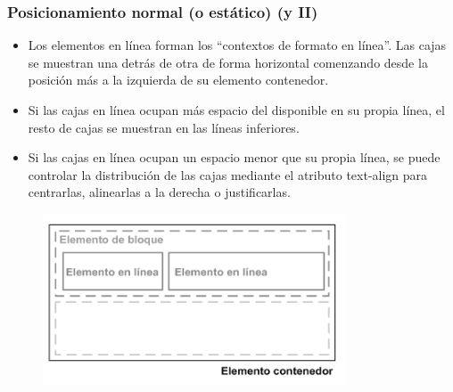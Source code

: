\documentclass[ucs]{beamer}
\begin{document}
\begin{frame}
\frametitle{Posicionamiento normal (o estático) (y II)}

\begin{itemize}
  \item Los elementos en línea forman los ``contextos de formato en línea''. Las cajas se muestran una detrás de otra de forma horizontal comenzando desde la posición más a la izquierda de su elemento contenedor.
  \item Si las cajas en línea ocupan más espacio del disponible en su propia línea, el resto de cajas se muestran en las líneas inferiores. 
  \item Si las cajas en línea ocupan un espacio menor que su propia línea, se puede controlar la distribución de las cajas mediante el atributo text-align para centrarlas, alinearlas a la derecha o justificarlas.
\end{itemize}


\begin{center}
\begin{figure}[p]
\includegraphics[width=0.8\textwidth]{figs/f0503.png}
\end{figure}
\end{center}

\end{frame}


\end{document}
